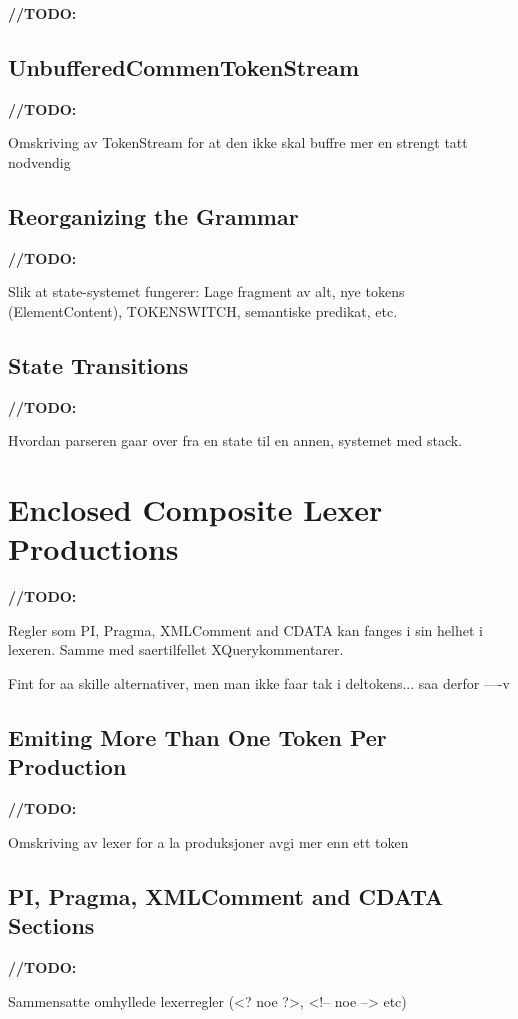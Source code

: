 \textbf{\LARGE //TODO:} 

\subsection{UnbufferedCommenTokenStream}
\textbf{\LARGE //TODO:}  

Omskriving av TokenStream for at den ikke skal buffre mer en strengt tatt nodvendig

\subsection{Reorganizing the Grammar}
\label{sect:rewriteGrammar:reorganizing}
\textbf{\LARGE //TODO:} 

Slik at state-systemet fungerer: Lage fragment av alt, nye tokens (ElementContent), TOKENSWITCH, semantiske predikat, etc.

\subsection{State Transitions}
\textbf{\LARGE //TODO:} 

Hvordan parseren gaar over fra en state til en annen, systemet med stack.

\section{Enclosed Composite Lexer Productions}
\label{sect:rewriteGrammar:enclosedComposite}
\textbf{\LARGE //TODO:} 

Regler som PI, Pragma, XMLComment and CDATA kan fanges i sin helhet i lexeren. Samme med saertilfellet XQuerykommentarer. 

Fint for aa skille alternativer, men man ikke faar tak i deltokens... saa derfor ----v

\subsection{Emiting More Than One Token Per Production}
\textbf{\LARGE //TODO:} 

Omskriving av lexer for a la produksjoner avgi mer enn ett token

\subsection{PI, Pragma, XMLComment and CDATA Sections}
\textbf{\LARGE //TODO:} 

Sammensatte omhyllede lexerregler (<? noe ?>, <!-- noe --> etc)

